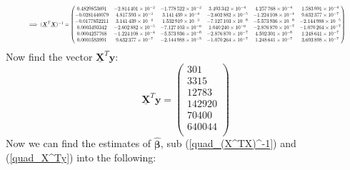 \documentclass[12pt]{article}
\newcommand{\vect}[1]{\boldsymbol{#1}}
\newcommand{\mat}[1]{\underline{\boldsymbol{#1}}}
\newcommand{\trans}[1]{#1^T}
\newcommand{\est}[1]{\hat{#1}}
\begin{document}
\begin{equation} \label{quad_(X^TX)^-1}
  \resizebox{0.93\linewidth}{!}{ $
   \implies (\trans{\mat{X}}\mat{X})^{-1} =
   \begin{pmatrix}
 0.4829853691 & \num{-2.814401e-02} & \num{-1.778522e-02} & \num{ 3.493342e-04} & \num{ 4.257768e-04} & \num{ 1.583991e-04} \\
-0.0281440079 & \num{ 4.817593e-03} & \num{ 3.141439e-04} & \num{-2.602882e-05} & \num{-1.224108e-04} & \num{ 9.632377e-07} \\
-0.0177852211 & \num{ 3.141439e-04} & \num{ 1.532919e-03} & \num{-7.127103e-06} & \num{-5.573936e-06} & \num{-2.144988e-05} \\
 0.0003493342 & \num{-2.602882e-05} & \num{-7.127103e-06} & \num{ 1.040240e-06} & \num{-2.876870e-07} & \num{-1.070264e-07} \\
 0.0004257768 & \num{-1.224108e-04} & \num{-5.573936e-06} & \num{-2.876870e-07} & \num{ 4.502301e-06} & \num{ 1.248641e-07} \\
 0.0001583991 & \num{ 9.632377e-07} & \num{-2.144988e-05} & \num{-1.070264e-07} & \num{ 1.248641e-07} & \num{ 3.693898e-07} \\
   \end{pmatrix}
  $}
\end{equation}
Now find the vector $\trans{\mat{X}}\vect{y}$:
\begin{equation} \label{quad_X^Ty}
  \trans{\mat{X}}\vect{y} =
  \begin{pmatrix}
    301     \\
    3315    \\
    12783   \\
    142920  \\
    70400   \\
    640044  \\
  \end{pmatrix}
\end{equation}
Now we can find the estimates of $\est{\vect{\beta}}$, sub (\ref{quad_(X^TX)^-1}) and (\ref{quad_X^Ty}) into the following:
\end{document}
